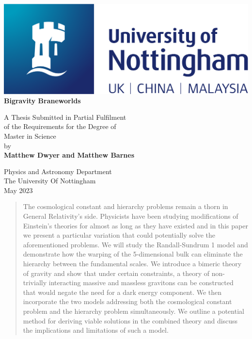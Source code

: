 \documentclass[11pt]{report}
\numberwithin{equation}{chapter}
\begin{document}
\begin{titlepage}
   \begin{center}
    \includegraphics[width=0.8\columnwidth]{Images/nottingham-logo.png} 
    \vspace*{2cm}
    \Huge\\
    
    \textbf{Bigravity Braneworlds}
    
    \vspace{2cm}
    \Large
    A Thesis Submitted in Partial Fulfilment\\
    of the Requirements for the Degree of\\
    Master in Science\\
    
    \vspace{0.7cm}
    by\\
    \vspace{0.5cm}
    \textbf{Matthew Dwyer and Matthew Barnes}
    
    \vspace{0.7cm}
    \large  
    Physics and Astronomy Department\\
    The University Of Nottingham\\
    May 2023
            
   \end{center}
\end{titlepage}
\begin{abstract}
    The cosmological constant and hierarchy problems remain a thorn in General Relativity's side. Physicists have been studying modifications of Einstein's theories for almost as long as they have existed and in this paper we present a particular variation that could potentially solve the aforementioned problems. We will study the Randall-Sundrum 1 model and demonstrate how the warping of the 5-dimensional bulk can eliminate the hierarchy between the fundamental scales. We introduce a bimeric theory of gravity and show that under certain constraints, a theory of non-trivially interacting massive and massless gravitons can be constructed that would negate the need for a dark energy component. We then incorporate the two models addressing both the cosmological constant problem and the hierarchy problem simultaneously. We outline a potential method for deriving viable solutions in the combined theory and discuss the implications and limitations of such a model.
\end{abstract}
\end{document}
